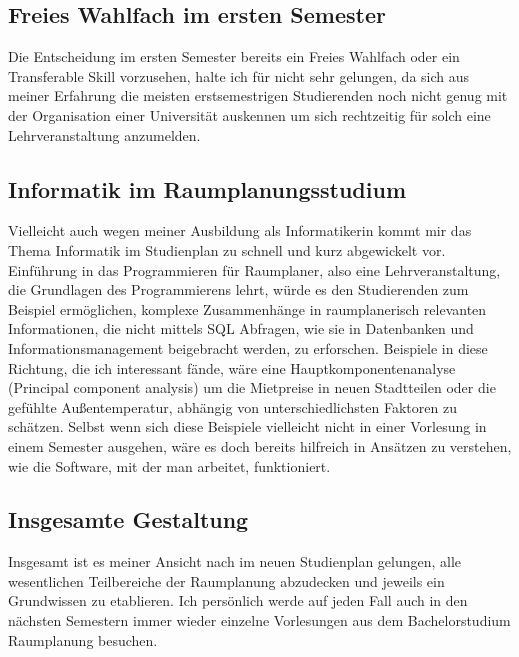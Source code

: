 \documentclass[]{article}
\begin{document}
\subsection{Freies Wahlfach im ersten Semester}
Die Entscheidung im ersten Semester bereits ein Freies Wahlfach oder ein Transferable Skill vorzusehen, halte ich für nicht sehr gelungen, da sich aus meiner Erfahrung die meisten erstsemestrigen Studierenden noch nicht genug mit der Organisation einer Universität auskennen um sich rechtzeitig für solch eine Lehrveranstaltung anzumelden.

\subsection{Informatik im Raumplanungsstudium}
Vielleicht auch wegen meiner Ausbildung als Informatikerin kommt mir das Thema Informatik im Studienplan zu schnell und kurz abgewickelt vor. Einführung in das Programmieren für Raumplaner, also eine Lehrveranstaltung, die Grundlagen des Programmierens lehrt, würde es den Studierenden zum Beispiel ermöglichen, komplexe Zusammenhänge in raumplanerisch relevanten Informationen, die nicht mittels SQL Abfragen, wie sie in Datenbanken und Informationsmanagement beigebracht werden, zu erforschen. Beispiele in diese Richtung, die ich interessant fände, wäre eine Hauptkomponentenanalyse (Principal component analysis) um die Mietpreise in neuen Stadtteilen oder die gefühlte Außentemperatur, abhängig von unterschiedlichsten Faktoren zu schätzen. Selbst wenn sich diese Beispiele vielleicht nicht in einer Vorlesung in einem Semester ausgehen, wäre es doch bereits hilfreich in Ansätzen zu verstehen, wie die Software, mit der man arbeitet, funktioniert.

\subsection{Insgesamte Gestaltung}
Insgesamt ist es meiner Ansicht nach im neuen Studienplan gelungen, alle wesentlichen Teilbereiche der Raumplanung abzudecken und jeweils ein Grundwissen zu etablieren. Ich persönlich werde auf jeden Fall auch in den nächsten Semestern immer wieder einzelne Vorlesungen aus dem Bachelorstudium Raumplanung besuchen.

 

\end{document}

